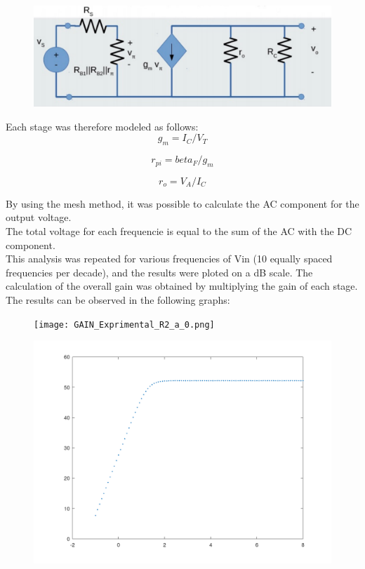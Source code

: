 \FloatBarrier

\begin{figure}
  \includegraphics{incremental_model.pdf}
  \caption{}
  \label{}
\end{figure}
\FloatBarrier 

Each stage was therefore modeled as follows:\\

\begin{equation}
 g_{m} = I_{C}/V_{T}
 \label{}
\end{equation} 

\begin{equation}
 r_{pi}= {beta}_{F}/g_{m}
   \label{}
\end{equation} 

\begin{equation}
  r_{o}= V_{A}/I_{C}
  \label{}
\end{equation} 

By using the mesh method, it was possible to calculate the AC component for the output voltage.\\
The total voltage for each frequencie is equal to the sum of the AC with the DC component.\\

This analysis was repeated for various frequencies of Vin (10 equally spaced frequencies per decade), and the results were ploted on a dB scale.
The calculation of the overall gain was obtained by multiplying the gain of each stage. The results can be observed in the following graphs:\\ 

\FloatBarrier

\begin{figure}
  \texttt{[image: GAIN\_Exprimental\_R2\_a\_0.png]}
  \caption{}
  \label{}
\end{figure}
\FloatBarrier 

\FloatBarrier

\begin{figure}
  \includegraphics{GAINVERDADEIRO.png}
  \caption{}
  \label{}
\end{figure}
\FloatBarrier


